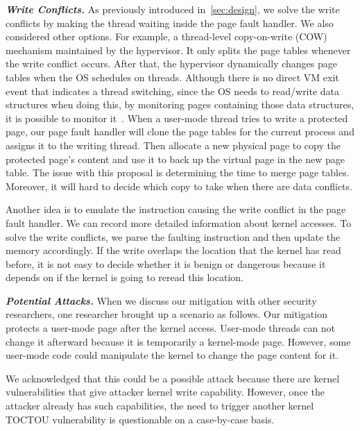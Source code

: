 \textbf{\textit{Write Conflicts.}} As previously introduced in~\autoref{sec:design}, we solve the write conflicts by making the thread waiting inside the page fault handler. We also considered other options. For example, a thread-level copy-on-write (COW) mechanism maintained by the hypervisor. It only splits the page tables whenever the write conflict occurs. After that, the hypervisor dynamically changes page tables when the OS schedules on threads. Although there is no direct VM exit event that indicates a thread switching, since the OS needs to read/write data structures when doing this, by monitoring pages containing those data structures, it is possible to monitor it~\cite{pan2017digtool}. When a user-mode thread tries to write a protected page, our page fault handler will clone the page tables for the current process and assigns it to the writing thread.  Then allocate a new physical page to copy the protected page's content and use it to back up the virtual page in the new page table.  The issue with this proposal is determining the time to merge page tables. Moreover, it will hard to decide which copy to take when there are data conflicts.

Another idea is to emulate the instruction causing the write conflict in the page fault handler. We can record more detailed information about kernel accesses. To solve the write conflicts, we parse the faulting instruction and then update the memory accordingly. If the write overlaps the location that the kernel has read before, it is not easy to decide whether it is benign or dangerous because it depends on if the kernel is going to reread this location.



\textbf{\textit{Potential Attacks.}} When we discuss our mitigation with other security researchers, one researcher brought up a scenario as follows. Our mitigation protects a user-mode page after the kernel access. User-mode threads can not change it afterward because it is temporarily a kernel-mode page. However, some user-mode code could manipulate the kernel to change the page content for it.

We acknowledged that this could be a possible attack because there are kernel vulnerabilities that give attacker kernel write capability. However, once the attacker already has such capabilities, the need to trigger another kernel TOCTOU vulnerability is questionable on a case-by-case basis.
